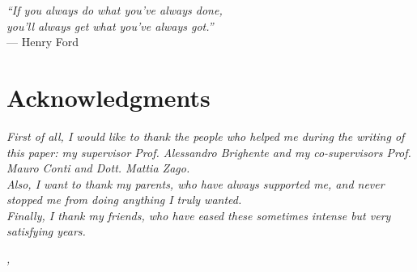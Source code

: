 
\cleardoublepage
{}
{}

\begin{flushright}{
	\slshape    
	``If you always do what you’ve always done, \\
	you’ll always get what you’ve always got.''} \\ 
	\medskip
    --- Henry Ford
\end{flushright}


\bigskip

\begingroup
\let\clearpage\relax
\let\cleardoublepage\relax
\let\cleardoublepage\relax

\chapter*{Acknowledgments}

\noindent \textit{First of all, I would like to thank the people who helped 
me during the writing of this paper: my supervisor Prof. Alessandro Brighente 
and my co-supervisors Prof. Mauro Conti and Dott. Mattia Zago.}\\

\noindent \textit{Also, I want to thank my parents, who have always supported
 me, and never stopped me from doing anything I truly wanted.}\\

\noindent \textit{Finally, I thank my friends, who have eased these sometimes 
intense but very satisfying years.}\\
\bigskip

\noindent\textit{\myLocation, \myTime}
\hfill \myName

\endgroup

